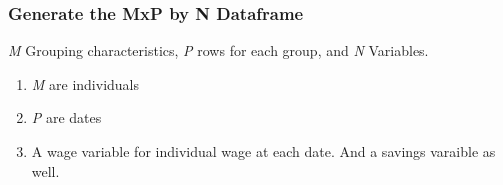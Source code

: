\documentclass[
]{book}
\providecommand{\tightlist}{%
  \setlength{\itemsep}{0pt}\setlength{\parskip}{0pt}}
\begin{document}
\hypertarget{generate-the-mxp-by-n-dataframe}{%
\subsubsection{Generate the MxP by N Dataframe}\label{generate-the-mxp-by-n-dataframe}}

\emph{M} Grouping characteristics, \emph{P} rows for each group, and \emph{N} Variables.

\begin{enumerate}
\def\labelenumi{\arabic{enumi}.}
\tightlist
\item
  \emph{M} are individuals
\item
  \emph{P} are dates
\item
  A wage variable for individual wage at each date. And a savings varaible as well.
\end{enumerate}
\end{document}
